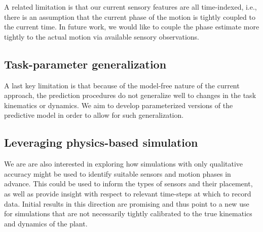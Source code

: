 A related limitation is that our current sensory features are all time-indexed, i.e., there is an assumption that the current phase of the motion is tightly coupled to the current time.  In future work, we would like to couple the phase estimate more tightly to the actual motion via available sensory observations.

\subsection*{Task-parameter generalization}

A last key limitation is that because of the model-free nature of the current approach, the prediction procedures do not generalize well to changes in the task kinematics or dynamics. 
We aim to develop parameterized versions of the predictive model in order to allow for such generalization.

\subsection*{Leveraging physics-based simulation}

We are are also interested in exploring how simulations with only qualitative accuracy might be used to identify suitable sensors and motion phases in advance. This could be used to inform the types of sensors and their placement, as well as provide insight with respect to relevant time-steps at which to record data.  Initial results in this direction are promising and thus point to a new use for simulations that are not necessarily tightly calibrated to the true kinematics and dynamics of the plant.

